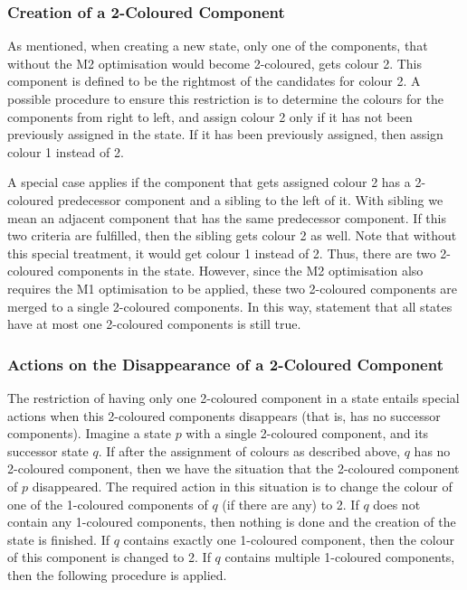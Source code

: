 \subsubsection{Creation of a 2-Coloured Component}
As mentioned, when creating a new state, only one of the components, that without the M2 optimisation would become 2-coloured, gets colour 2. This component is defined to be the rightmost of the candidates for colour 2. A possible procedure to ensure this restriction is to determine the colours for the components from right to left, and assign colour 2 only if it has not been previously assigned in the state. If it has been previously assigned, then assign colour 1 instead of 2.

A special case applies if the component that gets assigned colour 2 has a 2-coloured predecessor component and a sibling to the left of it. With sibling we mean an adjacent component that has the same predecessor component. If this two criteria are fulfilled, then the sibling gets colour 2 as well. Note that without this special treatment, it would get colour 1 instead of 2. Thus, there are two 2-coloured components in the state. However, since the M2 optimisation also requires the M1 optimisation to be applied, these two 2-coloured components are merged to a single 2-coloured components. In this way, statement that all states have at most one 2-coloured components is still true.


\subsubsection{Actions on the Disappearance of a 2-Coloured Component}
The restriction of having only one 2-coloured component in a state entails special actions when this 2-coloured components disappears (that is, has no successor components). Imagine a state $p$ with a single 2-coloured component, and its successor state $q$. If after the assignment of colours as described above, $q$ has no 2-coloured component, then we have the situation that the 2-coloured component of $p$ disappeared. The required action in this situation is to change the colour of one of the 1-coloured components of $q$ (if there are any) to 2. If $q$ does not contain any 1-coloured components, then nothing is done and the creation of the state is finished. If $q$ contains exactly one 1-coloured component, then the colour of this component is changed to 2. If $q$ contains multiple 1-coloured components, then the following procedure is applied.

